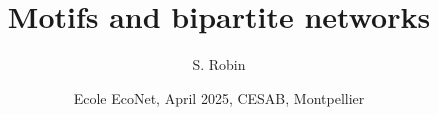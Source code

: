 \documentclass[9pt]{beamer}
\begin{document}
\title{Motifs and bipartite networks}
\author{S. Robin}
\date[EcoNet, Apr'25]{Ecole EcoNet, April 2025, CESAB, Montpellier}
\maketitle
















\backupbegin

\backupend

\end{document}
